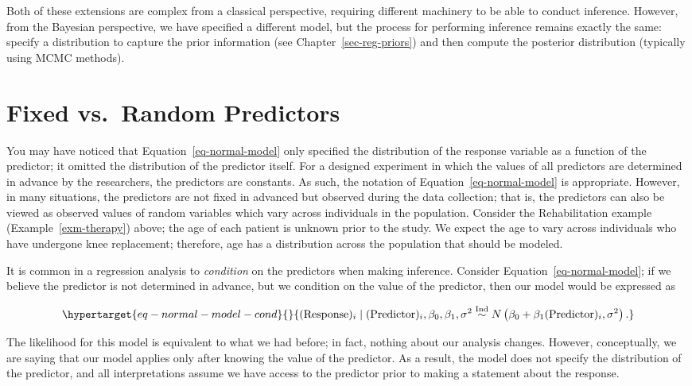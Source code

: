\documentclass[
  letterpaper,
  DIV=11,
  numbers=noendperiod]{scrreprt}
\theoremstyle{definition}
\theoremstyle{plain}
\theoremstyle{definition}
\theoremstyle{remark}
\begin{document}
Both of these extensions are complex from a classical perspective,
requiring different machinery to be able to conduct inference. However,
from the Bayesian perspective, we have specified a different model, but
the process for performing inference remains exactly the same: specify a
distribution to capture the prior information (see
Chapter~\ref{sec-reg-priors}) and then compute the posterior
distribution (typically using MCMC methods).

\hypertarget{fixed-vs.-random-predictors}{%
\section{Fixed vs.~Random
Predictors}\label{fixed-vs.-random-predictors}}

You may have noticed that Equation~\ref{eq-normal-model} only specified
the distribution of the response variable as a function of the
predictor; it omitted the distribution of the predictor itself. For a
designed experiment in which the values of all predictors are determined
in advance by the researchers, the predictors are constants. As such,
the notation of Equation~\ref{eq-normal-model} is appropriate. However,
in many situations, the predictors are not fixed in advanced but
observed during the data collection; that is, the predictors can also be
viewed as observed values of random variables which vary across
individuals in the population. Consider the Rehabilitation example
(Example~\ref{exm-therapy}) above; the age of each patient is unknown
prior to the study. We expect the age to vary across individuals who
have undergone knee replacement; therefore, age has a distribution
across the population that should be modeled.

It is common in a regression analysis to \emph{condition} on the
predictors when making inference. Consider
Equation~\ref{eq-normal-model}; if we believe the predictor is not
determined in advance, but we condition on the value of the predictor,
then our model would be expressed as

\begin{equation}\protect\hypertarget{eq-normal-model-cond}{}{(\text{Response})_i \mid (\text{Predictor})_i, \beta_0, \beta_1, \sigma^2 \stackrel{\text{Ind}}{\sim}N\left(\beta_0 + \beta_1 (\text{Predictor})_i, \sigma^2\right).}\label{eq-normal-model-cond}\end{equation}

The likelihood for this model is equivalent to what we had before; in
fact, nothing about our analysis changes. However, conceptually, we are
saying that our model applies only after knowing the value of the
predictor. As a result, the model does not specify the distribution of
the predictor, and all interpretations assume we have access to the
predictor prior to making a statement about the response.
\end{document}
